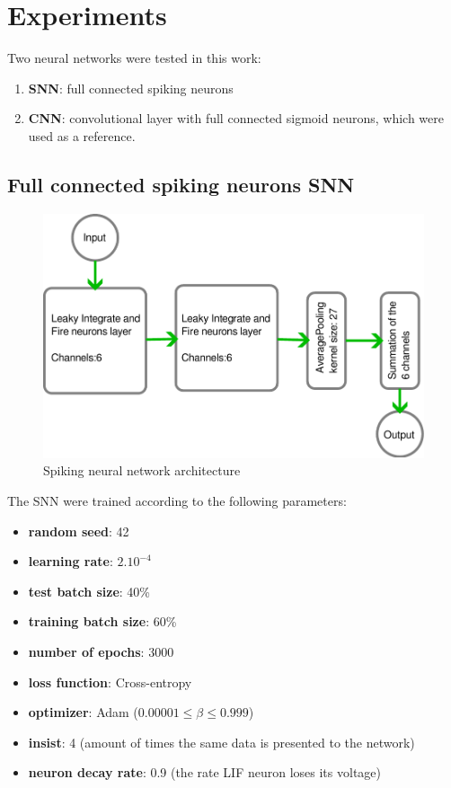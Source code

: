 \section{Experiments}
	\label{sec:experiments}
	\par Two neural networks were tested in this work:
	\begin{enumerate}
		\item \label{itm:snn} \textbf{SNN}: full connected spiking neurons
		\item \label{itm:cnn} \textbf{CNN}: convolutional layer with full connected sigmoid neurons, which were used as a reference.
	\end{enumerate}

	\subsection{Full connected spiking neurons SNN}
	\begin{figure}[H]
		\centering
		\includegraphics[width=.6\linewidth]{images/architectureSNN}
		\caption{Spiking neural network architecture}
		\label{fig:architecturesnn}
	\end{figure}

		\par The SNN were trained according to the following parameters:
		\begin{itemize}
			\item \textbf{random seed}: 42
			\item \textbf{learning rate}: $2.10^{-4}$
			\item \textbf{test batch size}: 40\%
			\item \textbf{training batch size}: 60\%
			\item \textbf{number of epochs}: 3000
			\item \textbf{loss function}: Cross-entropy
			\item \textbf{optimizer}: Adam ($0.00001 \leq \beta \leq 0.999$)
			\item \textbf{insist}: 4 (amount of times the same data is presented to the network)
			\item \textbf{neuron decay rate}: 0.9 (the rate LIF neuron loses its voltage)
		\end{itemize}

